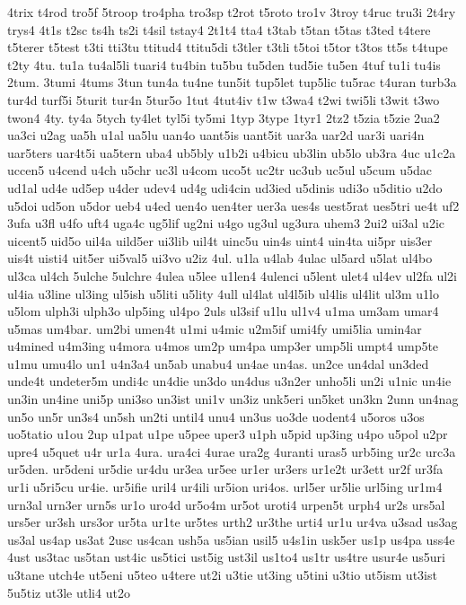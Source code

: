 {4trix
t4rod
tro5f
5troop
tro4pha
tro3sp
t2rot
t5roto
tro1v
3troy
t4ruc
tru3i
2t4ry
trys4
4t1s
t2sc
ts4h
ts2i
t4sil
tstay4
2t1t4
tta4
t3tab
t5tan
t5tas
t3ted
t4tere
t5terer
t5test
t3ti
tti3tu
ttitud4
ttitu5di
t3tler
t3tli
t5toi
t5tor
t3tos
tt5s
t4tupe
t2ty
4tu.
tu1a
tu4al5li
tuari4
tu4bin
tu5bu
tu5den
tud5ie
tu5en
4tuf
tu1i
tu4is
2tum.
3tumi
4tums
3tun
tun4a
tu4ne
tun5it
tup5let
tup5lic
tu5rac
t4uran
turb3a
tur4d
turf5i
5turit
tur4n
5tur5o
1tut
4tut4iv
t1w
t3wa4
t2wi
twi5li
t3wit
t3wo
twon4
4ty.
ty4a
5tych
ty4let
tyl5i
ty5mi
1typ
3type
1tyr1
2tz2
t5zia
t5zie
2ua2
ua3ci
u2ag
ua5h
u1al
ua5lu
uan4o
uant5is
uant5it
uar3a
uar2d
uar3i
uari4n
uar5ters
uar4t5i
ua5tern
uba4
ub5bly
u1b2i
u4bicu
ub3lin
ub5lo
ub3ra
4uc
u1c2a
uccen5
u4cend
u4ch
u5chr
uc3l
u4com
uco5t
uc2tr
uc3ub
uc5ul
u5cum
u5dac
ud1al
ud4e
ud5ep
u4der
udev4
ud4g
udi4cin
ud3ied
u5dinis
udi3o
u5ditio
u2do
u5doi
ud5on
u5dor
ueb4
u4ed
uen4o
uen4ter
uer3a
ues4s
uest5rat
ues5tri
ue4t
uf2
3ufa
u3fl
u4fo
uft4
uga4c
ug5lif
ug2ni
u4go
ug3ul
ug3ura
uhem3
2ui2
ui3al
u2ic
uicent5
uid5o
uil4a
uild5er
ui3lib
uil4t
uinc5u
uin4s
uint4
uin4ta
ui5pr
uis3er
uis4t
uisti4
uit5er
ui5val5
ui3vo
u2iz
4ul.
u1la
u4lab
4ulac
ul5ard
u5lat
ul4bo
ul3ca
ul4ch
5ulche
5ulchre
4ulea
u5lee
u1len4
4ulenci
u5lent
ulet4
ul4ev
ul2fa
ul2i
ul4ia
u3line
ul3ing
ul5ish
u5liti
u5lity
4ull
ul4lat
ul4l5ib
ul4lis
ul4lit
ul3m
u1lo
u5lom
ulph3i
ulph3o
ulp5ing
ul4po
2uls
ul3sif
u1lu
ul1v4
u1ma
um3am
umar4
u5mas
um4bar.
um2bi
umen4t
u1mi
u4mic
u2m5if
umi4fy
umi5lia
umin4ar
u4mined
u4m3ing
u4mora
u4mos
um2p
um4pa
ump3er
ump5li
umpt4
ump5te
u1mu
umu4lo
un1
u4n3a4
un5ab
unabu4
un4ae
un4as.
un2ce
un4dal
un3ded
unde4t
undeter5m
undi4c
un4die
un3do
un4dus
u3n2er
unho5li
un2i
u1nic
un4ie
un3in
un4ine
uni5p
uni3so
un3ist
uni1v
un3iz
unk5eri
un5ket
un3kn
2unn
un4nag
un5o
un5r
un3s4
un5sh
un2ti
until4
unu4
un3us
uo3de
uodent4
u5oros
u3os
uo5tatio
u1ou
2up
u1pat
u1pe
u5pee
uper3
u1ph
u5pid
up3ing
u4po
u5pol
u2pr
upre4
u5quet
u4r
ur1a
4ura.
ura4ci
4urae
ura2g
4uranti
uras5
urb5ing
ur2c
urc3a
ur5den.
ur5deni
ur5die
ur4du
ur3ea
ur5ee
ur1er
ur3ers
ur1e2t
ur3ett
ur2f
ur3fa
ur1i
u5ri5cu
ur4ie.
ur5ifie
uril4
ur4ili
ur5ion
uri4os.
url5er
ur5lie
url5ing
ur1m4
urn3al
urn3er
urn5s
ur1o
uro4d
ur5o4m
ur5ot
uroti4
urpen5t
urph4
ur2s
urs5al
urs5er
ur3sh
urs3or
ur5ta
ur1te
ur5tes
urth2
ur3the
urti4
ur1u
ur4va
u3sad
us3ag
us3al
us4ap
us3at
2usc
us4can
ush5a
us5ian
usil5
u4s1in
usk5er
us1p
us4pa
uss4e
4ust
us3tac
us5tan
ust4ic
us5tici
ust5ig
ust3il
us1to4
us1tr
us4tre
usur4e
us5uri
u3tane
utch4e
ut5eni
u5teo
u4tere
ut2i
u3tie
ut3ing
u5tini
u3tio
ut5ism
ut3ist
5u5tiz
ut3le
utli4
ut2o
}
